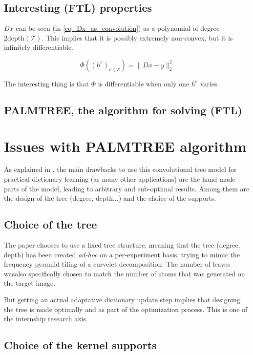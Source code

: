 \subsection{Interesting (FTL) properties}
$Dx$ can be seen (in \cref{eq_Dx_as_convolution}) as a polynomial of degree $2\text{depth}(\mathcal{T})$. This implies that it is possibly extremely non-convex, but it is infinitely differentiable.

$$\Phi((h^e)_{e \in \mathcal{E}}) = \lVert Dx-y \rVert^2_2$$

The interesting thing is that $\Phi$ is differentiable when only one $h^e$ varies. %


\subsection{PALMTREE, the algorithm for solving (FTL)}

\section{Issues with PALMTREE algorithm}
As explained in \cite[p. 23]{chabiron_optimization_2016}, the main drawbacks to use this convolutional tree model for practical dictionary learning (as many other applications) are the hand-made parts of the model, leading to arbitrary and sub-optimal results. Among them are the design of the tree (degree, depth...) and the choice of the supports. %
\subsection{Choice of the tree}
The paper chooses to use a fixed tree structure, meaning that the tree (degree, depth) has been created \emph{ad-hoc} on a per-experiment basis, trying to mimic the frequency pyramid tiling of a curvelet decomposition. The number of leaves wasalso specifically chosen to match the number of atoms that was generated on the target image.

But getting an actual adaptative dictionary update step implies that designing the tree is made optimally and as part of the optimization process. This is one of the internship research axis.

\subsection{Choice of the kernel supports}

